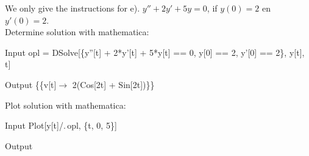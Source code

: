 \begin{Answer}\phantom{}  We only give the instructions for e).
	    \Question $y'' + 2y'+ 5y = 0$, \qquad if \quad $y(0) = 2$ \quad en \quad $y'(0) = 2$.\\
	   
	   Determine solution with mathematica:\\
\begin{mdframed}[default,backgroundcolor=gray!40,roundcorner=8pt]
\begin{mmaCell}{Input}
  opl = DSolve[\{y''[t] + 2*y'[t] + 5*y[t] == 0, y[0] == 2, y'[0] == 2\}, 
  y[t], t]
\end{mmaCell}

\begin{mmaCell}{Output}
	 \{\{v[t]\(\to\) 2(Cos[2t] + Sin[2t])\}\}
\end{mmaCell}
\end{mdframed}

	Plot solution with mathematica: \\
\begin{mdframed}[default,backgroundcolor=gray!40,roundcorner=8pt]
\begin{mmaCell}[morefunctionlocal={t},moredefined={sol}]{Input}
  Plot[y[t]/.\(\pmb{\,}\)opl, \{t, 0, 5\}]
\end{mmaCell}

\begin{mmaCell}[moregraphics={moreig={scale=.4}}]{Output}
\end{mmaCell}
\end{mdframed}

	   \EndCurrentQuestion
\end{Answer}

